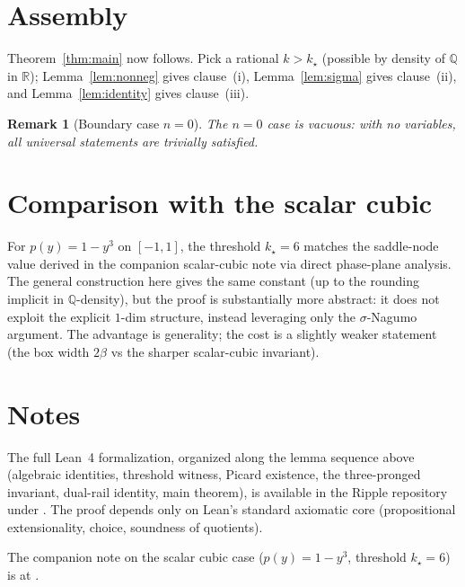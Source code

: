 \documentclass[11pt]{article}
\newtheorem{remark}[theorem]{Remark}
\newcommand{\R}{\mathbb{R}}
\newcommand{\Q}{\mathbb{Q}}
\begin{document}
\section{Assembly}\label{sec:assembly}

Theorem~\ref{thm:main} now follows.  Pick a rational $k > k_\star$
(possible by density of $\Q$ in $\R$);
Lemma~\ref{lem:nonneg} gives clause~(i),
Lemma~\ref{lem:sigma} gives clause~(ii),
and Lemma~\ref{lem:identity} gives clause~(iii).

\begin{remark}[Boundary case $n = 0$]
The $n = 0$ case is vacuous: with no variables, all universal
statements are trivially satisfied.
\end{remark}

\section{Comparison with the scalar cubic}

For $p(y) = 1 - y^3$ on $[-1, 1]$, the threshold
$k_\star = 6$ matches the saddle-node value derived in the companion
scalar-cubic note via direct phase-plane analysis.  The general
construction here gives the same constant (up to the rounding implicit
in $\Q$-density), but the proof is substantially more abstract: it
does not exploit the explicit $1$-dim structure, instead leveraging
only the $\sigma$-Nagumo argument.  The advantage is generality; the
cost is a slightly weaker statement (the box width $2\beta$ vs the
sharper scalar-cubic invariant).

\section*{Notes}

The full Lean~4 formalization, organized along the lemma sequence
above (algebraic identities, threshold witness, Picard existence, the
three-pronged invariant, dual-rail identity, main theorem), is available
in the Ripple repository under
.  The proof
depends only on Lean's standard axiomatic core (propositional
extensionality, choice, soundness of quotients).

The companion note on the scalar cubic case ($p(y) = 1 - y^3$,
threshold $k_\star = 6$) is at
.
\end{document}
